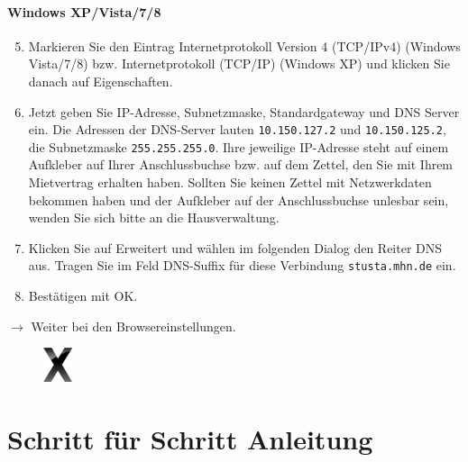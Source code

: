 \documentclass[a4paper,12pt]{scrartcl}
\begin{document}
\paragraph*{Windows XP/Vista/7/8}
\begin{enumerate}
    \setcounter{enumi}{4}
    \item Markieren Sie den Eintrag Internetprotokoll Version 4 (TCP/IPv4) (Windows Vista/7/8) bzw. Internetprotokoll  (TCP/IP) (Windows XP) und klicken Sie danach auf Eigenschaften.
    \item Jetzt geben Sie IP-Adresse, Subnetzmaske, Standardgateway und DNS Server ein. Die Adressen der DNS-Server lauten \nolinkurl{10.150.127.2} und \nolinkurl{10.150.125.2}, die Subnetzmaske \nolinkurl{255.255.255.0}. Ihre jeweilige IP-Adresse steht auf einem Aufkleber auf Ihrer Anschlussbuchse bzw. auf dem Zettel, den Sie mit Ihrem Mietvertrag erhalten haben. Sollten Sie keinen Zettel mit Netzwerkdaten bekommen haben und der Aufkleber auf der Anschlussbuchse unlesbar sein, wenden Sie sich bitte an die Hausverwaltung.
    \item Klicken Sie auf Erweitert und wählen im folgenden Dialog den Reiter DNS aus. Tragen Sie im Feld DNS-Suffix für diese Verbindung \nolinkurl{stusta.mhn.de} ein.
    \item Bestätigen mit OK.
\end{enumerate}
$\rightarrow$ Weiter bei den Browsereinstellungen.



\pagebreak

\begin{figure}[t!]
    \raggedleft
    \vspace{-20pt}
    \includegraphics[height=1cm,keepaspectratio]{Bilder/OSXLeopard}
    \vspace{-30pt}
\end{figure}

\section*{Schritt für Schritt Anleitung}
\end{document}
